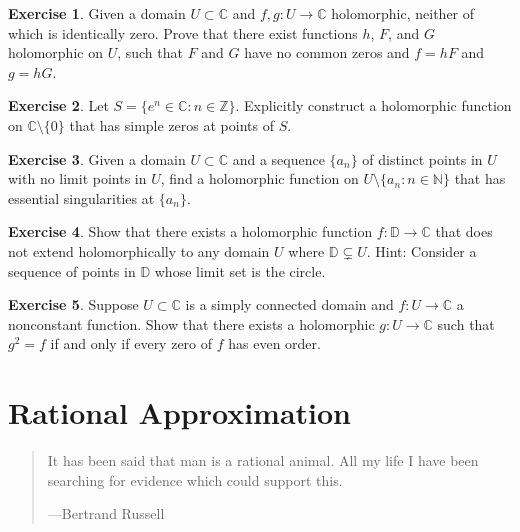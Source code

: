 \documentclass[12pt,openany]{book}
\newcommand{\C}{{\mathbb{C}}}
\newcommand{\Z}{{\mathbb{Z}}}
\newcommand{\N}{{\mathbb{N}}}
\newcommand{\D}{{\mathbb{D}}}
\theoremstyle{plain}
\theoremstyle{remark}
\theoremstyle{definition}
\newenvironment{exbox}{%
    \def\FrameCommand{\vrule width 1pt \relax\hspace{10pt}}%
    \MakeFramed{\advance\hsize-\width\FrameRestore}%
}{%
    \endMakeFramed
}
\newenvironment{myepigraph}{%
    \begin{quote}%
    \begingroup\itshape
}{%
    \endgroup%
    \end{quote}
}
\theoremstyle{exercise}
\newtheorem{exercise}{Exercise}[section]
\theoremstyle{example}
\begin{document}
\begin{exbox}
\begin{exercise}
Given a domain $U \subset \C$ and $f,g \colon U \to \C$ holomorphic, neither of
which is identically zero.  Prove that there exist functions $h$, $F$,
and $G$ holomorphic on $U$, such that $F$ and $G$ have no common zeros and
$f=hF$ and $g=hG$.
\end{exercise}

\begin{exercise}
Let $S = \bigl\{ e^n \in \C : n \in \Z \bigr\}$.
Explicitly construct a holomorphic function on $\C \setminus \{ 0 \}$
that has simple zeros at
points of $S$.
\end{exercise}

\begin{exercise}
Given a domain $U \subset \C$ and a sequence $\{ a_n \}$ of distinct points in $U$
with no limit points in $U$, find a holomorphic function on
$U \setminus \{ a_n : n \in \N \}$ that has essential
singularities at $\{ a_n \}$.
\end{exercise}

\begin{exercise}
Show that there exists a holomorphic function $f \colon \D \to \C$ that does
not extend holomorphically to any domain $U$ where $\D \subsetneq U$.  Hint:
Consider a sequence of points in $\D$ whose limit set is the circle.
\end{exercise}

\begin{exercise}
Suppose $U \subset \C$ is a simply connected domain and $f \colon U \to \C$
a nonconstant function.  Show that there exists a holomorphic $g \colon U
\to \C$ such that $g^2 = f$ if and only if every zero of $f$ has even order.
\end{exercise}
\end{exbox}


\chapter{Rational Approximation} \label{ch:runge}

\begin{myepigraph}
It has been said that man is a rational animal. All my life I have been searching for evidence which could support this.

---Bertrand Russell
\end{myepigraph}
\end{document}
